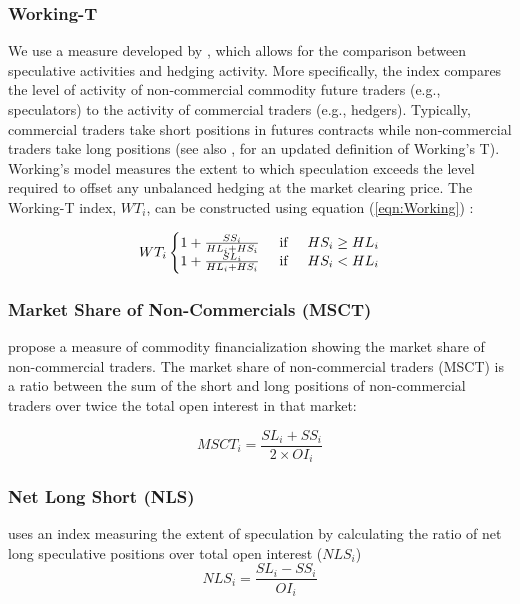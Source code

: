 \documentclass[12pt]{article}
\begin{document}
\subsubsection{Working-T}
We use a measure developed by \citet{working1960speculation}, which allows for the comparison between speculative activities and hedging activity. More specifically, the index compares the level of activity of non-commercial commodity future traders (e.g., speculators) to the activity of commercial traders (e.g., hedgers). Typically, commercial traders take short positions in futures contracts while non-commercial traders take long positions (see also \citet{shanker2017new}, for an updated definition of Working’s T). Working’s model measures the extent to which speculation exceeds the level required to offset any unbalanced hedging at the market clearing price. 
The Working-T index, $WT_i$, can be constructed using equation (\ref{eqn:Working}) :

\begin{equation} \label{eqn:Working}
WT_i\left\{\begin{matrix}
 1+\frac{SS_i}{HL_i+HS_i} \hspace{0.5cm} \mbox{if} \hspace{0.5cm} HS_i \ge HL_i\\
1+\frac{SL_i}{HL_i+HS_i} \hspace{0.5cm} \mbox{if} \hspace{0.5cm} HS_i < HL_i
\end{matrix}\right.
\end{equation}


\subsubsection{Market Share of Non-Commercials (MSCT)}
\citet{buyukcsahin2014speculators} propose a measure of commodity financialization showing the market share of non-commercial traders. The market share of non-commercial traders (MSCT) is a ratio between the sum of the short and long positions of non-commercial traders over twice the total open interest in that market: 

\begin{equation} \label{eqn:MSCT}
MSCT_i=\frac{SL_i+SS_i}{2 \times OI_i}
\end{equation}

\subsubsection{Net Long Short (NLS)}
\citet{hedegaard2011margins} uses an index measuring the extent of speculation by calculating the ratio of net long speculative positions over total open interest ($NLS_i$)
\begin{equation} \label{eqn:NLS}
NLS_i=\frac{SL_i-SS_i}{OI_i}
\end{equation}
\end{document}
